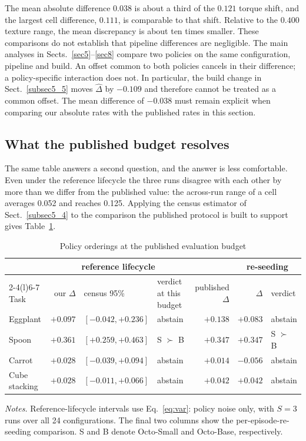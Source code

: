 \documentclass[pdflatex,iicol,sn-apa]{sn-jnl}
\theoremstyle{remark}
\newcommand{\tablenote}[1]{\par\vspace{4pt}\noindent
\begin{minipage}{\linewidth}\tablefootnotefont\raggedright #1\par\end{minipage}}
\begin{document}
The mean absolute difference $0.038$ is about a third of the $0.121$ torque shift,
and the largest cell difference, $0.111$, is comparable to that shift. Relative to the
$0.400$ texture range, the mean discrepancy is about ten times smaller. These comparisons
do not establish that pipeline differences are negligible. The main analyses in
Sects.~\ref{sec5}--\ref{sec8} compare two policies on the same configuration, pipeline and build.
An offset common to both policies cancels in their difference; a policy-specific interaction
does not. In particular, the build change in Sect.~\ref{subsec5_5} moves $\hat\Delta$ by
$-0.109$ and therefore cannot be treated as a common offset. The mean difference of $-0.038$
must remain explicit when comparing our absolute rates with the published rates in this section.

\subsection{What the published budget resolves}\label{subsec6_3}

The same table answers a second question, and the answer is less comfortable. Even under the
reference lifecycle the three runs disagree with each other by more than we differ from the published
value: the across-run range of a cell averages 0.052 and reaches 0.125. Applying the census estimator
of Sect.~\ref{subsec5_4} to the comparison the published protocol is built to support gives
Table~\ref{tab5}.

\begin{table}[t]
\caption{Policy orderings at the published evaluation budget}\label{tab5}
\begin{tabular}{@{}lrllrrl@{}}
\toprule
 & \multicolumn{3}{c}{reference lifecycle} & & \multicolumn{2}{c}{re-seeding} \\
\cmidrule(lr){2-4}\cmidrule(l){6-7}
Task & our $\Delta$ & census 95\% & verdict at this budget & published $\Delta$ & $\Delta$ & verdict \\
\midrule
Eggplant & $+0.097$ & $[-0.042, +0.236]$ & abstain & $+0.138$ & $+0.083$ & abstain \\
Spoon & $+0.361$ & $[+0.259, +0.463]$ & S $\succ$ B & $+0.347$ & $+0.347$ & S $\succ$ B \\
Carrot & $+0.028$ & $[-0.039, +0.094]$ & abstain & $+0.014$ & $-0.056$ & abstain \\
Cube stacking & $+0.028$ & $[-0.011, +0.066]$ & abstain & $+0.042$ & $+0.042$ & abstain \\
\bottomrule
\end{tabular}
\tablenote{\textit{Notes.} Reference-lifecycle intervals use Eq.~\eqref{eq:var}: policy noise only, with $S=3$ runs over all 24 configurations. The final two columns show the per-episode-re-seeding comparison. S and B denote Octo-Small and Octo-Base, respectively.}
\end{table}
\end{document}
